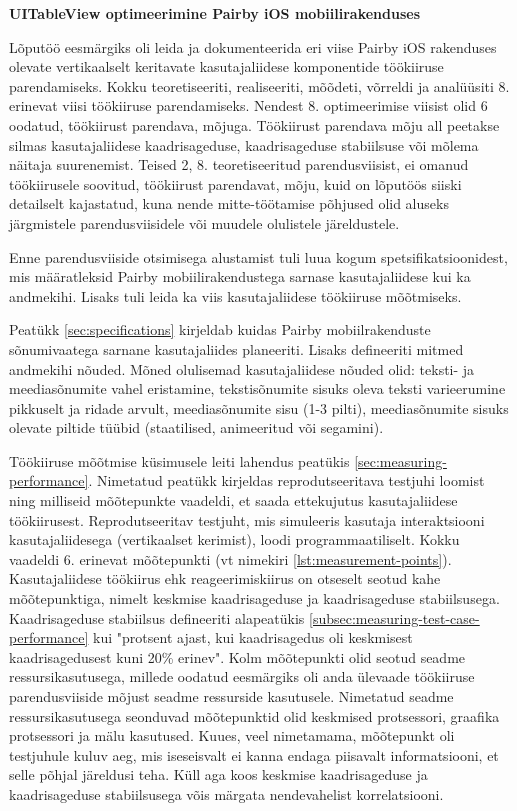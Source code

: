 \documentclass[a4paper,12pt]{article}
\begin{document}

\textbf{UITableView optimeerimine Pairby iOS mobiilirakenduses}

Lõputöö eesmärgiks oli leida ja dokumenteerida eri viise Pairby iOS rakenduses olevate vertikaalselt keritavate kasutajaliidese komponentide töökiiruse parendamiseks. Kokku teoretiseeriti, realiseeriti, mõõdeti, võrreldi ja analüüsiti 8. erinevat viisi töökiiruse parendamiseks. Nendest 8. optimeerimise viisist olid 6 oodatud, töökiirust parendava, mõjuga. Töökiirust parendava mõju all peetakse silmas kasutajaliidese kaadrisageduse, kaadrisageduse stabiilsuse või mõlema näitaja suurenemist. Teised 2, 8. teoretiseeritud parendusviisist, ei omanud töökiirusele soovitud, töökiirust parendavat, mõju, kuid on lõputöös siiski detailselt kajastatud, kuna nende mitte-töötamise põhjused olid aluseks järgmistele parendusviisidele või muudele olulistele järeldustele.

Enne parendusviiside otsimisega alustamist tuli luua kogum spetsifikatsioonidest, mis määratleksid Pairby mobiilirakendustega sarnase kasutajaliidese kui ka andmekihi. Lisaks tuli leida ka viis kasutajaliidese töökiiruse mõõtmiseks.

Peatükk \ref{sec:specifications} kirjeldab kuidas Pairby mobiilrakenduste sõnumivaatega sarnane kasutajaliides planeeriti. Lisaks defineeriti mitmed andmekihi nõuded. Mõned olulisemad kasutajaliidese nõuded olid: teksti- ja meediasõnumite vahel eristamine, tekstisõnumite sisuks oleva teksti varieerumine pikkuselt ja ridade arvult, meediasõnumite sisu (1-3 pilti), meediasõnumite sisuks olevate piltide tüübid (staatilised, animeeritud või segamini).

Töökiiruse mõõtmise küsimusele leiti lahendus peatükis \ref{sec:measuring-performance}. Nimetatud peatükk kirjeldas reprodutseeritava testjuhi loomist ning milliseid mõõtepunkte vaadeldi, et saada ettekujutus kasutajaliidese töökiirusest. Reprodutseeritav testjuht, mis simuleeris kasutaja interaktsiooni kasutajaliidesega (vertikaalset kerimist), loodi programmaatiliselt. Kokku vaadeldi 6. erinevat mõõtepunkti (vt nimekiri \ref{lst:measurement-points}). Kasutajaliidese töökiirus ehk reageerimiskiirus on otseselt seotud kahe mõõtepunktiga, nimelt keskmise kaadrisageduse ja kaadrisageduse stabiilsusega. Kaadrisageduse stabiilsus defineeriti alapeatükis \ref{subsec:measuring-test-case-performance} kui "protsent ajast, kui kaadrisagedus oli keskmisest kaadrisagedusest kuni 20\% erinev". Kolm mõõtepunkti olid seotud seadme ressursikasutusega, millede oodatud eesmärgiks oli anda ülevaade töökiiruse parendusviiside mõjust seadme ressurside kasutusele. Nimetatud seadme ressursikasutusega seonduvad mõõtepunktid olid keskmised protsessori, graafika protsessori ja mälu kasutused. Kuues, veel nimetamama, mõõtepunkt oli testjuhule kuluv aeg, mis iseseisvalt ei kanna endaga piisavalt informatsiooni, et selle põhjal järeldusi teha. Küll aga koos keskmise kaadrisageduse ja kaadrisageduse stabiilsusega võis märgata nendevahelist korrelatsiooni.
\end{document}
